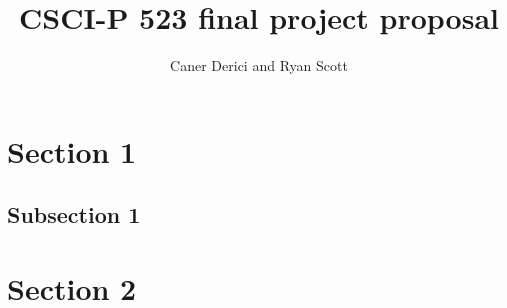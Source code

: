 \documentclass[12pt]{article}
\begin{document}
 
\title{CSCI-P 523 final project proposal\vspace{-2ex}}
\author{Caner Derici and Ryan Scott} 
 
\maketitle

\section{Section 1}

\subsection{Subsection 1}

\section{Section 2}
\end{document}
